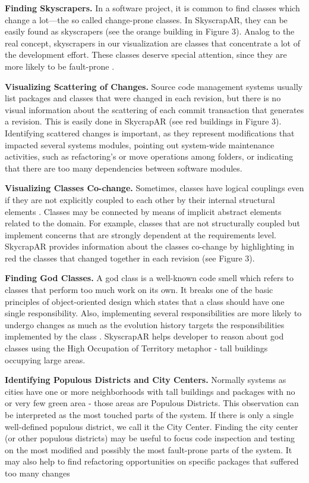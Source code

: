 \textbf{Finding Skyscrapers.} In a software project, it is common to find classes which change a lot---the so called change-prone classes. In SkyscrapAR, they can be easily found as skyscrapers (see the orange building in Figure 3). Analog to the real concept, skyscrapers in our visualization are classes that concentrate a lot of the development effort. These classes deserve special attention, since they are more likely to be fault-prone \cite{nagappan:2005}. 

\textbf{Visualizing Scattering of Changes.} Source code management systems usually list packages and classes that were changed in each revision, but there is no visual information about the scattering of each commit transaction that generates a revision. This is easily done in SkycrapAR (see red buildings in Figure 3). Identifying scattered changes is important, as they represent modifications that impacted several systems modules, pointing out system-wide maintenance activities, such as refactoring's or move operations among folders, or indicating that there are too many dependencies between software modules.

\textbf{Visualizing Classes Co-change.} Sometimes, classes have logical couplings even if they are not explicitly coupled to each other by their internal structural elements \cite{gall:1998}. Classes may be connected by means of implicit abstract elements related to the domain. For example, classes that are not structurally coupled but implement concerns that are strongly dependent at the requirements level. SkycrapAR provides information about the classes co-change by highlighting in red the classes that changed together in each revision (see Figure 3). 

\textbf{Finding God Classes.} A god class is a well-known code smell which refers to classes that perform too much work on its own. It breaks one of the basic principles of object-oriented design which states that a class should have one single responsibility. Also, implementing several responsibilities are more likely to undergo changes as much as the evolution history targets the responsibilities implemented by the class \cite{silva:2012}. SkyscrapAR helps developer to reason about god classes using the High Occupation of Territory metaphor - tall buildings occupying large areas.

\textbf{Identifying Populous Districts and City Centers.} Normally systems as cities have one or more neighborhoods with tall buildings and packages with no or very few green area - those areas are Populous Districts. This observation can be interpreted as the most touched parts of the system. If there is only a single well-defined populous district, we call it the City Center. Finding the city center (or other populous districts) may be useful to focus code inspection and testing on the most modified and possibly the most fault-prone parts of the system. It may also help to find refactoring opportunities on specific packages that suffered too many changes

